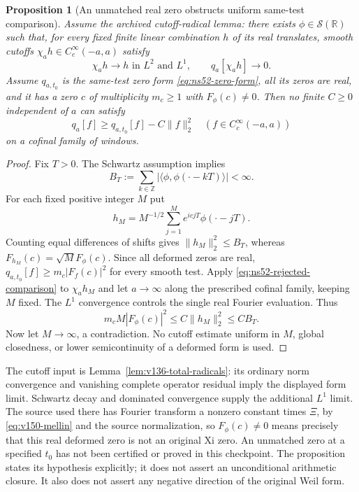 \documentclass[11pt]{article}
\newtheorem{proposition}[theorem]{Proposition}
\theoremstyle{remark}
\begin{document}
\begin{proposition}[An unmatched real zero obstructs uniform
same-test comparison]\label{prop:ns52-unmatched}
Assume the archived cutoff-radical lemma: there exists
$\phi\in\mathcal S(\mathbb R)$ such that, for every fixed finite
linear combination $h$ of its real translates, smooth cutoffs
$\chi_a h\in C_c^\infty(-a,a)$ satisfy
\[
 \chi_a h\longrightarrow h\text{ in }L^2\text{ and }L^1,
 \qquad q_a[\chi_a h]\longrightarrow0.
\]
Assume $q_{a,t_0}$ is the same-test zero form
\eqref{eq:ns52-zero-form}, all its zeros are real, and it has a
zero $c$ of multiplicity $m_c\ge1$ with $F_\phi(c)\ne0$.
Then no finite $C\ge0$ independent of $a$ can satisfy
\begin{equation}\label{eq:ns52-rejected-comparison}
 q_a[f]\ge q_{a,t_0}[f]-C\|f\|_2^2
 \quad(f\in C_c^\infty(-a,a))
\end{equation}
on a cofinal family of windows.
\end{proposition}
\begin{proof}
Fix $T>0$. The Schwartz assumption implies
\[
 B_T:=\sum_{k\in\mathbb Z}
       |\langle\phi,\phi(\cdot-kT)\rangle|<\infty.
\]
For each fixed positive integer $M$ put
\[
 h_M=M^{-1/2}\sum_{j=1}^M e^{icjT}\phi(\cdot-jT).
\]
Counting equal differences of shifts gives
$\|h_M\|_2^2\le B_T$, whereas
$F_{h_M}(c)=\sqrt M F_\phi(c)$.
Since all deformed zeros are real,
$q_{a,t_0}[f]\ge m_c|F_f(c)|^2$ for every smooth test.
Apply \eqref{eq:ns52-rejected-comparison} to $\chi_a h_M$ and
let $a\to\infty$ along the prescribed cofinal family, keeping $M$
fixed. The $L^1$ convergence controls the single real Fourier
evaluation. Thus
\[
 m_c M|F_\phi(c)|^2\le C\|h_M\|_2^2\le CB_T.
\]
Now let $M\to\infty$, a contradiction. No cutoff estimate uniform
in $M$, global closedness, or lower semicontinuity of a deformed
form is used.
\end{proof}

The cutoff input is Lemma~\ref{lem:v136-total-radicals}: its ordinary
norm convergence and vanishing complete operator residual imply the
displayed form limit. Schwartz decay and dominated convergence supply
the additional $L^1$ limit. The source used there has Fourier transform
a nonzero constant times $\Xi$, by \eqref{eq:v150-mellin} and the
source normalization, so $F_\phi(c)\ne0$ means precisely that this
real deformed zero is not an original Xi zero. An unmatched zero
at a specified $t_0$ has not been certified or proved in this
checkpoint. The proposition states its hypothesis explicitly; it
does not assert an unconditional arithmetic closure. It also does
not assert any negative direction of the original Weil form.
\end{document}
